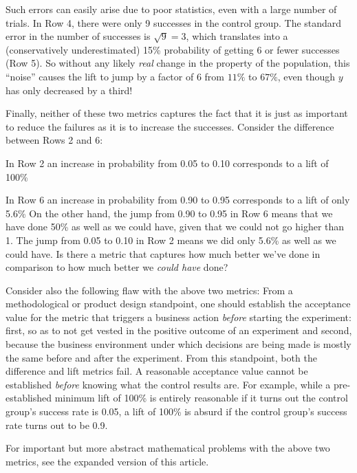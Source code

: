 \documentclass[letterpaper,12pt]{article}
\begin{document}
Such errors can easily arise due to poor statistics, even with a large
number of trials. In Row 4, there were only 9 successes in the control
group. The standard error in the number of successes is \(\sqrt{9}
=3\), which translates into a (conservatively underestimated) 15\%
probability of getting 6 or fewer successes (Row 5). So without any
likely {\em real} change in the property of the population, this
``noise'' causes the lift to jump by a factor of \(6\) from \(11\%\)
to \(67\%\), even though \(y\) has only decreased by a third!

Finally, neither of these two metrics captures the fact that it is
just as important to reduce the failures as it is to increase the
successes. Consider the difference between Rows 2 and 6:
\be
\item In Row 2 an increase in probability from 0.05 to 0.10
  corresponds to a lift of 100\%
\item In Row 6 an increase in probability from 0.90 to 0.95
  corresponds to a lift of only 5.6\%
\ee
On the other hand, the jump from 0.90 to 0.95 in Row 6 means that we
have done 50\% as well as we could have, given that we could not go
higher than 1.  The jump from 0.05 to 0.10 in Row 2 means we did only
5.6\% as well as we could have. Is there a metric that captures how
much better we've done in comparison to how much better we {\em could
  have} done?

Consider also the following flaw with the above two metrics: From a
methodological or product design standpoint, one should establish the
acceptance value for the metric that triggers a business action {\em
  before} starting the experiment: first, so as to not get vested in
the positive outcome of an experiment and second, because the business
environment under which decisions are being made is mostly the same
before and after the experiment. From this standpoint, both the
difference and lift metrics fail. A reasonable acceptance value cannot
be established {\em before} knowing what the control results are. For
example, while a pre-established minimum lift of 100\% is entirely
reasonable if it turns out the control group's success rate is 0.05, a
lift of 100\% is absurd if the control group's success rate turns out
to be 0.9.

For important but more abstract mathematical problems with the above
two metrics, see the expanded version of this article.
\end{document}

